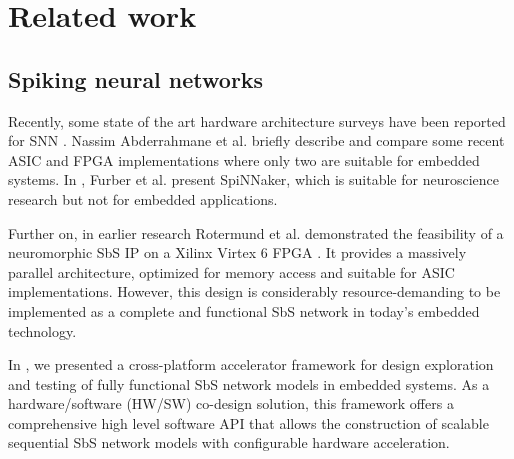 \section{Related work}
\label{sec:related_work}
\subsection{Spiking neural networks}
Recently, some state of the art hardware architecture surveys have been reported for SNN \cite{Design_Exploration_SbS_Trans20, SNN_Survey_Trans19, zhang2018survey}. Nassim Abderrahmane et al. briefly describe and compare some recent ASIC and FPGA implementations where only two are suitable for embedded systems. In \cite{Spinnaker_Trans13}, Furber et al. present SpiNNaker, which is suitable for neuroscience research but not for embedded applications.

Further on, in earlier research Rotermund et al. demonstrated the feasibility of a neuromorphic SbS IP on a Xilinx Virtex 6 FPGA \cite{rotermund2018massively}. It provides a massively parallel architecture, optimized for memory access and suitable for ASIC implementations. However, this design is considerably resource-demanding to be implemented as a complete and functional SbS network in today's embedded technology.

In \cite{nevarez2020accelerator}, we presented a cross-platform accelerator framework for design exploration and testing of fully functional SbS network models in embedded systems. As a hardware/software (HW/SW) co-design solution, this framework offers a comprehensive high level software API that allows the construction of scalable sequential SbS network models with configurable hardware acceleration.

